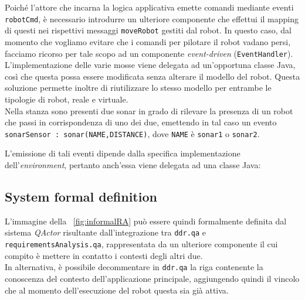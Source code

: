 \documentclass{../llncs}
\newcommand{\codescript}[1]{{\mbox{\small{\texttt{#1}}}}\xspace}
\newcommand{\code}[1]{{\color{blue}\small{\texttt{#1}}}}
\newcommand{\qa}{\textsf{\textit{QActor}}\xspace}
\newcommand{\labelssec}[1]{\label{ssec:#1}}
\newcommand{\xf}[1]{\figurename~\ref{fig:#1}}
\begin{document}
Poiché l'attore che incarna la logica applicativa emette comandi mediante eventi \codescript{robotCmd}, è necessario introdurre un ulteriore componente che effettui il mapping di questi nei rispettivi messaggi \codescript{moveRobot} gestiti dal robot. In questo caso, dal momento che vogliamo evitare che i comandi per pilotare il robot vadano persi, facciamo ricorso per tale scopo ad un componente \emph{event-driven} (\texttt{EventHandler}).\\



L'implementazione delle varie mosse viene delegata ad un'opportuna classe Java, così che questa possa essere modificata senza alterare il modello del robot. Questa soluzione permette inoltre di riutilizzare lo stesso modello per entrambe le tipologie di robot, reale e virtuale.\\

Nella stanza sono presenti due sonar in grado di rilevare la presenza di un robot che passi in corrispondenza di uno dei due, emettendo in tal caso un evento \codescript{sonarSensor : sonar(NAME,DISTANCE)}, dove \codescript{NAME} è \code{sonar1} o \code{sonar2}.

L'emissione di tali eventi dipende dalla specifica implementazione dell'\textit{environment}, pertanto anch'essa viene delegata ad una classe Java:\\



\subsection{System formal definition}
\labelssec{formalRA}
L'immagine della \xf{informalRA} può essere quindi formalmente definita dal sistema {\qa} risultante dall'integrazione tra \codescript{ddr.qa} e \codescript{requirementsAnalysis.qa}, rappresentata da un ulteriore componente il cui compito è mettere in contatto i contesti degli altri due.\\



In alternativa, è possibile decommentare in \codescript{ddr.qa} la riga contenente la conoscenza del contesto dell'applicazione principale, aggiungendo quindi il vincolo che al momento dell'esecuzione del robot questa sia già attiva.
\end{document}
